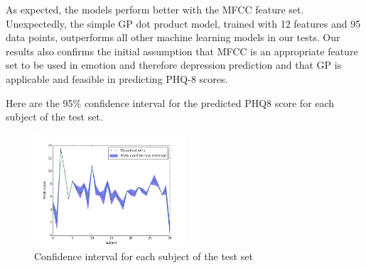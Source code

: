 \documentclass{article}
\begin{document}
	As expected, the models perform better with the MFCC feature set. 
	Unexpectedly, the simple GP dot product model, trained with 12 features and 95 data points, outperforms all other machine learning models in our tests. 
	Our results also confirms the initial assumption that MFCC is an appropriate feature set to be used in emotion and therefore depression prediction and that GP is 
	applicable and feasible in predicting PHQ-8 scores.

	Here are the 95\% confidence interval for the predicted PHQ8 score for each subject of the test set.

	\begin{figure}[h]
 		\begin{center}
		\includegraphics[width=0.5\textwidth]{Confidence}
  		\end{center}
  		\caption{Confidence interval for each subject of the test set}
  		\label{Confidence}
 	\end{figure}
\end{document}
